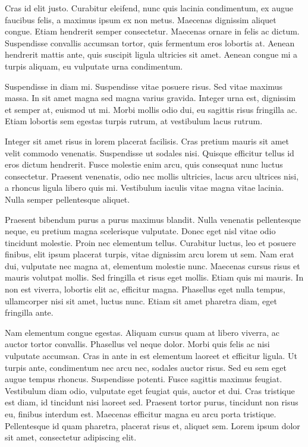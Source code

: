 Cras id elit justo. Curabitur eleifend, nunc quis lacinia condimentum,
ex augue faucibus felis, a maximus ipsum ex non metus. Maecenas
dignissim aliquet congue. Etiam hendrerit semper consectetur. Maecenas
ornare in felis ac dictum. Suspendisse convallis accumsan tortor, quis
fermentum eros lobortis at. Aenean hendrerit mattis ante, quis suscipit
ligula ultricies sit amet. Aenean congue mi a turpis aliquam, eu
vulputate urna condimentum.

Suspendisse in diam mi. Suspendisse vitae posuere risus. Sed vitae
maximus massa. In sit amet magna sed magna varius gravida. Integer urna
est, dignissim et semper at, euismod ut mi. Morbi mollis odio dui, eu
sagittis risus fringilla ac. Etiam lobortis sem egestas turpis rutrum,
at vestibulum lacus rutrum.

Integer sit amet risus in lorem placerat facilisis. Cras pretium mauris
sit amet velit commodo venenatis. Suspendisse ut sodales nisi. Quisque
efficitur tellus id eros dictum hendrerit. Fusce molestie enim arcu,
quis consequat nunc luctus consectetur. Praesent venenatis, odio nec
mollis ultricies, lacus arcu ultrices nisi, a rhoncus ligula libero quis
mi. Vestibulum iaculis vitae magna vitae lacinia. Nulla semper
pellentesque aliquet.

Praesent bibendum purus a purus maximus blandit. Nulla venenatis
pellentesque neque, eu pretium magna scelerisque vulputate. Donec eget
nisl vitae odio tincidunt molestie. Proin nec elementum
tellus. Curabitur luctus, leo et posuere finibus, elit ipsum placerat
turpis, vitae dignissim arcu lorem ut sem. Nam erat dui, vulputate nec
magna at, elementum molestie nunc. Maecenas cursus risus et mauris
volutpat mollis. Sed fringilla et risus eget mollis. Etiam quis mi
mauris. In non est viverra, lobortis elit ac, efficitur magna. Phasellus
eget nulla tempus, ullamcorper nisi sit amet, luctus nunc. Etiam sit
amet pharetra diam, eget fringilla ante.

Nam elementum congue egestas. Aliquam cursus quam at libero viverra, ac
auctor tortor convallis. Phasellus vel neque dolor. Morbi quis felis ac
nisi vulputate accumsan. Cras in ante in est elementum laoreet et
efficitur ligula. Ut turpis ante, condimentum nec arcu nec, sodales
auctor risus. Sed eu sem eget augue tempus rhoncus. Suspendisse
potenti. Fusce sagittis maximus feugiat. Vestibulum diam odio, vulputate
eget feugiat quis, auctor et dui. Cras tristique est diam, id tincidunt
nisi laoreet sed. Praesent tortor purus, tincidunt non risus eu, finibus
interdum est. Maecenas efficitur magna eu arcu porta
tristique. Pellentesque id quam pharetra, placerat risus et, aliquet
sem. Lorem ipsum dolor sit amet, consectetur adipiscing elit.


